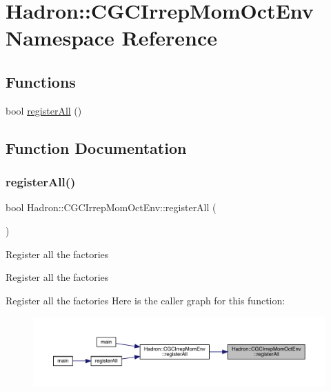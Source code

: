 \hypertarget{namespaceHadron_1_1CGCIrrepMomOctEnv}{}\section{Hadron\+:\+:C\+G\+C\+Irrep\+Mom\+Oct\+Env Namespace Reference}
\label{namespaceHadron_1_1CGCIrrepMomOctEnv}
\subsection*{Functions}
\begin{DoxyCompactItemize}
\item 
bool \mbox{\hyperlink{namespaceHadron_1_1CGCIrrepMomOctEnv_ac421d6769dc91c9ccc748ebbba3d108e}{register\+All}} ()
\end{DoxyCompactItemize}


\subsection{Function Documentation}
\mbox{\label{namespaceHadron_1_1CGCIrrepMomOctEnv_ac421d6769dc91c9ccc748ebbba3d108e}} 
\subsubsection{\texorpdfstring{registerAll()}{registerAll()}}
{\footnotesize\ttfamily bool Hadron\+::\+C\+G\+C\+Irrep\+Mom\+Oct\+Env\+::register\+All (\begin{DoxyParamCaption}{ }\end{DoxyParamCaption})}

Register all the factories

Register all the factories

Register all the factories Here is the caller graph for this function\+:
\nopagebreak
\begin{figure}[H]
\begin{center}
\leavevmode
\includegraphics[width=350pt]{d8/d19/namespaceHadron_1_1CGCIrrepMomOctEnv_ac421d6769dc91c9ccc748ebbba3d108e_icgraph}
\end{center}
\end{figure}
